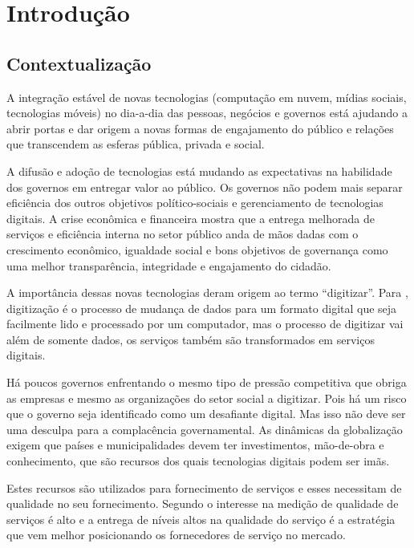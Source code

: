 \chapter[Introdução]{Introdução}
\section{Contextualização}
A integração estável de novas tecnologias (computação em nuvem, mídias sociais, tecnologias móveis) no dia-a-dia das pessoas, negócios e governos está ajudando a abrir portas e dar origem a novas formas de engajamento do público  e relações que transcendem as esferas pública, privada e social.\cite{oecd2014}

A difusão e adoção de tecnologias está mudando as expectativas na habilidade dos governos em entregar valor ao público. Os governos não podem mais separar eficiência dos outros objetivos político-sociais e gerenciamento de tecnologias digitais. A crise econômica e financeira mostra que a entrega melhorada de serviços e eficiência interna no setor público anda de mãos dadas com o crescimento econômico, igualdade social e bons objetivos de governança como uma melhor transparência, integridade e engajamento do cidadão.\cite{oecd2014}

A importância dessas novas tecnologias deram origem ao termo “digitizar”. Para \cite{steven2015}, digitização é o processo de mudança de dados para um formato digital que seja facilmente lido e processado por um computador, mas o processo de digitizar vai além de somente dados, os serviços também são transformados em serviços digitais.

Há poucos governos enfrentando o mesmo tipo de pressão competitiva que obriga as empresas e mesmo as organizações do setor social a digitizar. Pois há um risco que o governo seja identificado como um desafiante digital. Mas isso não deve ser uma desculpa para a complacência governamental. As dinâmicas da globalização exigem que países e municipalidades devem ter investimentos, mão-de-obra e conhecimento, que são recursos dos quais tecnologias digitais podem ser imãs. \cite{mckinsey2016}

Estes recursos são utilizados para fornecimento de serviços e esses necessitam de qualidade no seu fornecimento. Segundo \cite{cronintaylor1992} o interesse na medição de qualidade de serviços é alto e a entrega de níveis altos na qualidade do serviço é a estratégia que vem melhor posicionando os fornecedores de serviço no mercado. 

